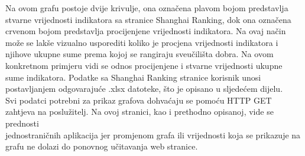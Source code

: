 \documentclass[times, utf8, zavrsni]{fer}
\begin{document}
       \FloatBarrier
Na ovom grafu postoje dvije krivulje, ona označena plavom bojom predstavlja 
stvarne vrijednosti indikatora sa stranice Shanghai Ranking, dok ona označena crvenom bojom predstavlja procijenjene vrijednosti indikatora.
Na ovaj način može se lakše vizualno usporediti koliko je procjena vrijednosti indikatora i njihove ukupne sume  prema kojoj se rangiraju sveučilišta dobra. 
Na ovom konkretnom primjeru vidi se odnos procijenjene i stvarne 
vrijednosti ukupne sume indikatora.
Podatke sa Shanghai Ranking stranice korisnik unosi postavljanjem  
odgovarajuće .xlsx datoteke, što je opisano u sljedećem dijelu.
\\Svi podatci potrebni za prikaz grafova dohvaćaju se pomoću HTTP GET zahtjeva na poslužitelj. Na ovoj stranici, kao i prethodno opisanoj, 
vide se prednosti \\jednostraničnih aplikacija jer promjenom grafa ili vrijednosti koja se prikazuje na grafu ne dolazi do ponovnog 
učitavanja web stranice.
\end{document}

